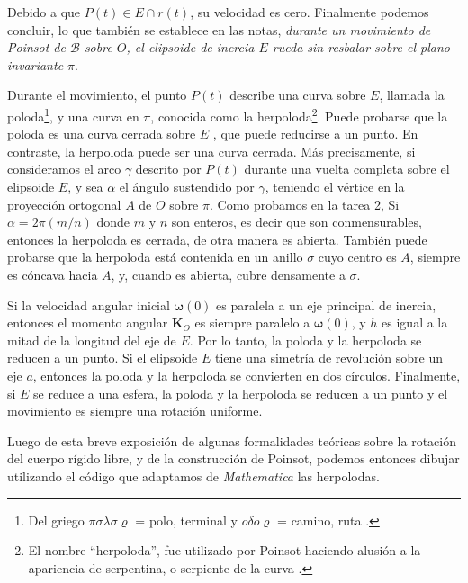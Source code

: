 \documentclass[a4paper,10pt]{article}
\numberwithin{equation}{section}
\begin{document}
\vspace{.3cm}

Debido a que $P(t) \in E \cap r(t)$, su velocidad es cero. Finalmente podemos concluir, 
lo que también se establece en las notas, \emph{durante un movimiento de Poinsot de $\mathcal{B}$
sobre $O$, el elipsoide de inercia $E$ rueda sin resbalar sobre el plano invariante $\pi$}.

\vspace{.3cm}

Durante el movimiento, el punto $P(t)$ describe una curva sobre $E$, llamada la poloda\footnote{
Del griego $\pi\sigma\lambda\sigma\varrho$ = polo, terminal y $o\delta o \varrho$ = camino, ruta \cite{spivak}.}, y 
una curva en $\pi$, conocida como la herpoloda\footnote{El nombre ``herpoloda'',
fue utilizado por Poinsot haciendo alusión a la apariencia de serpentina,
o serpiente de la curva \cite{spivak}.}. Puede probarse que 
la poloda es una curva cerrada sobre $E$ \cite{whittaker}, que puede reducirse 
a un punto. En contraste, la herpoloda puede ser una curva cerrada. Más 
precisamente, si consideramos el arco $\gamma$ descrito por $P(t)$ durante 
una vuelta completa sobre el elipsoide $E$, y sea $\alpha$ el ángulo sustendido 
por $\gamma$, teniendo el vértice en la proyección ortogonal $A$ de $O$ sobre 
$\pi$. Como probamos en la tarea 2, Si $\alpha = 2\pi(m/n)$ donde $m$ y $n$
son enteros, es decir que son conmensurables, entonces la herpoloda es 
cerrada, de otra manera es abierta. También puede probarse que la herpoloda está
contenida en un anillo $\sigma$ cuyo centro es $A$, siempre es cóncava hacia 
$A$, y, cuando es abierta, cubre densamente a $\sigma$. 

\vspace{.3cm}

Si la velocidad angular inicial $\mathbf{\omega}(0)$ es paralela a un eje
principal de inercia, entonces el momento angular $\mathbf{K}_O$ es siempre paralelo 
a $\mathbf{\omega}(0)$, y $h$ es igual a la mitad de la longitud del eje 
de $E$. Por lo tanto, la poloda y la herpoloda se reducen a un punto. Si el
elipsoide $E$ tiene una simetría de revolución sobre un eje $a$, entonces 
la poloda y la herpoloda se convierten en dos círculos. Finalmente, si 
$E$ se reduce a una esfera, la poloda y la herpoloda se reducen a un 
punto y el movimiento es siempre una rotación uniforme.

\vspace{.3cm}

Luego de esta breve exposición de algunas formalidades teóricas sobre la rotación
del cuerpo rígido libre, y de la construcción de Poinsot, podemos entonces 
dibujar utilizando el código que adaptamos de \emph{Mathematica} las herpolodas.
\end{document}

